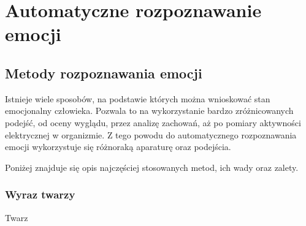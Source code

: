 \chapter{Automatyczne rozpoznawanie emocji}\label{ch:automatyczne-rozpoznawanie-emocji}

\section{Metody rozpoznawania emocji}\label{sec:metody-rozpoznawania-emocji}

Istnieje wiele sposobów, na podstawie których można wnioskować stan emocjonalny człowieka.
Pozwala to na wykorzystanie bardzo zróżnicowanych podejść, od oceny wyglądu, przez analizę zachowań, aż po pomiary aktywności elektrycznej w organizmie.
Z tego powodu do automatycznego rozpoznawania emocji wykorzystuje się różnoraką aparaturę oraz podejścia.

Poniżej znajduje się opis najczęściej stosowanych metod\cite{Varghese2015, Dzedzickis2020}, ich wady oraz zalety.

\subsection{Wyraz twarzy}\label{subsec:wyraz-twarzy}
Twarz